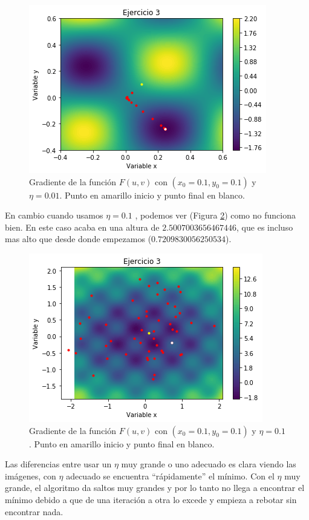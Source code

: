 \documentclass[12pt,a4paper]{article}
\begin{document}
\begin{figure}[H]  %
	\centering
	\includegraphics{images/segundoDescensoGradiente1.png}  
	\caption{Gradiente de la función \(F(u,v)\) con   \((x_{0}=0.1, y_{0}=0.1)\) y \(\eta=0.01\). Punto en amarillo inicio y punto final en blanco.}
	\label{figura2}
\end{figure}
En cambio cuando usamos \(\eta=0.1\) , podemos ver (Figura  \ref{figura3}) como no funciona bien. En este caso acaba en una altura de \(2.5007003656467446\), que es incluso mas alto que desde donde empezamos (\(0.7209830056250534\)).
\begin{figure}[H]  %
	\centering
	\includegraphics{images/segundoDescensoGradiente2.png}  
	\caption{Gradiente de la función \(F(u,v)\) con   \((x_{0}=0.1, y_{0}=0.1)\) y \(\eta=0.1\). Punto en amarillo inicio y punto final en blanco.}
	\label{figura3}
\end{figure}
Las diferencias entre usar un \(\eta\) muy grande o uno adecuado es clara viendo las imágenes, con \(\eta\) adecuado se encuentra ``rápidamente'' el mínimo. Con el \(\eta\) muy grande, el algoritmo da saltos muy grandes y por lo tanto no llega a encontrar el mínimo debido a que de una iteración a otra lo excede y empieza a rebotar sin encontrar nada.
\end{document}
